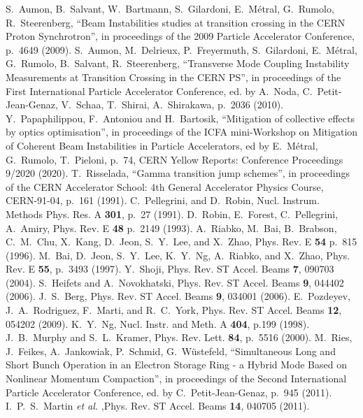 \documentclass{article}
\begin{document}
\begin{thebibliography}{99}
%
 S.~Aumon, B.~Salvant, W.~Bartmann, S.~Gilardoni, E.~M\'etral, G.~Rumolo, R.~Steerenberg, ``Beam Instabilities studies at transition crossing in the CERN Proton Synchrotron'', in proceedings of the 2009 Particle Accelerator Conference, p.~4649 (2009).
%
 S.~Aumon, M.~Delrieux, P.~Freyermuth, S.~Gilardoni, E.~M\'etral, G.~Rumolo, B.~Salvant, R.~Steerenberg, ``Transverse Mode Coupling Instability Measurements at Transition Crossing in the CERN PS'', in proceedings of the First International Particle Accelerator Conference, ed. by A.~Noda, C.~Petit-Jean-Genaz, V.~Schaa, T.~Shirai, A.~Shirakawa, p.~2036 (2010).
%
 Y.~Papaphilippou, F.~Antoniou and H.~Bartosik, ``Mitigation of collective effects by optics optimisation'', in proceedings of the ICFA mini-Workshop on Mitigation of Coherent Beam Instabilities in Particle Accelerators, ed by E.~M\'etral, G.~Rumolo, T.~Pieloni, p.~74, CERN Yellow Reports: Conference Proceedings 9/2020 (2020).
%
 T.~Risselada, ``Gamma transition jump schemes'', in proceedings of the CERN Accelerator School: 4th General Accelerator Physics Course, CERN-91-04, p.~161 (1991).
%
 C.~Pellegrini, and D.~Robin, Nucl. Instrum. Methods Phys. Res. A {\bf 301}, p.~27 (1991).
%
 D.~Robin, E.~Forest, C.~Pellegrini, A.~Amiry, Phys. Rev. E {\bf 48} p.~2149 (1993).
%
 A.~Riabko, M.~Bai, B.~Brabson, C.~M.~Chu, X.~Kang, D.~Jeon, S.~Y.~Lee, and X.~Zhao, Phys. Rev. E {\bf 54} p.~815 (1996).
%
 M.~Bai, D.~Jeon, S.~Y.~Lee, K.~Y.~Ng, A.~Riabko, and X.~Zhao, Phys. Rev. E {\bf 55}, p.~3493 (1997).
%
 Y.~Shoji, Phys. Rev. ST Accel. Beams {\bf 7}, 090703 (2004).
%
 S.~Heifets and A.~Novokhatski, Phys. Rev. ST Accel. Beams {\bf 9}, 044402 (2006).
%
 J.~S.~Berg, Phys. Rev. ST Accel. Beams {\bf 9}, 034001 (2006).
%
 E.~Pozdeyev, J.~A.~Rodriguez, F.~Marti, and R.~C.~York, Phys. Rev. ST Accel. Beams {\bf 12}, 054202 (2009).
%
 K.~Y.~Ng, Nucl. Instr. and Meth. A  {\bf 404}, p.199 (1998).
%
 J.~B.~Murphy and S.~L.~Kramer, Phys. Rev. Lett. {\bf 84}, p.~5516 (2000).
%
 M.~Ries, J.~Feikes, A.~Jankowiak, P.~Schmid, G.~W\"ustefeld, ``Simultaneous Long and Short Bunch Operation in an Electron Storage Ring - a Hybrid Mode Based on Nonlinear Momentum Compaction'', in proceedings of the Second International Particle Accelerator Conference, ed. by C.~Petit-Jean-Genaz, p.~945 (2011).
%
 I.~P.~S.~Martin {\sl et al.} ,Phys. Rev. ST Accel. Beams {\bf 14}, 040705 (2011).

\end{thebibliography}
\end{document}
